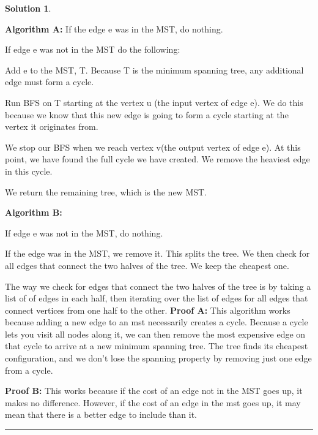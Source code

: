 \documentclass{article}
\theoremstyle{definition}
\def\fline{\rule{0.75\linewidth}{0.5pt}}
\newcommand{\finishline}{\begin{center}\fline\end{center}}
\newtheorem*{solution*}{Solution}
\newenvironment{solution}{\begin{solution*}}{{\finishline} \end{solution*}}
\begin{document}
\begin{solution}

    \

    \textbf{Algorithm A: } 
    If the edge e was in the MST, do nothing.

    If edge e was not in the MST do the following:

    Add e to the MST, T. Because T is the minimum spanning tree, any additional edge must form a cycle. 

    Run BFS on T starting at the vertex u (the input vertex of edge e). We do this because we know that this new edge is going to form a cycle starting at the vertex it originates from.
    
    We stop our BFS when we reach vertex v(the output vertex of edge e). At this point, we have found the full cycle we have created. We remove the heaviest edge in this cycle.

    We return the remaining tree, which is the new MST.


    
    \textbf{Algorithm B: } 

    If edge e was not in the MST, do nothing.

    If the edge was in the MST, we remove it. This splits the tree. We then check for all edges that connect the two halves of the tree. We keep the cheapest one.

    The way we check for edges that connect the two halves of the tree is by taking a list of of edges in each half, then iterating over the list of edges for all edges that connect vertices from one half to the other. 
    \textbf{Proof A: } 
    This algorithm works because adding a new edge to an mst necessarily creates a cycle. Because a cycle lets you visit all nodes along it, we can then remove the most expensive edge on that cycle to arrive at a new minimum spanning tree. The tree finds its cheapest configuration, and we don't lose the spanning property by removing just one edge from a cycle.

    \textbf{Proof B: }
    This works because if the cost of an edge not in the MST goes up, it makes no difference. However, if the cost of an edge in the mst goes up, it may mean that there is a better edge to include than it. 


\end{solution}
\end{document}
